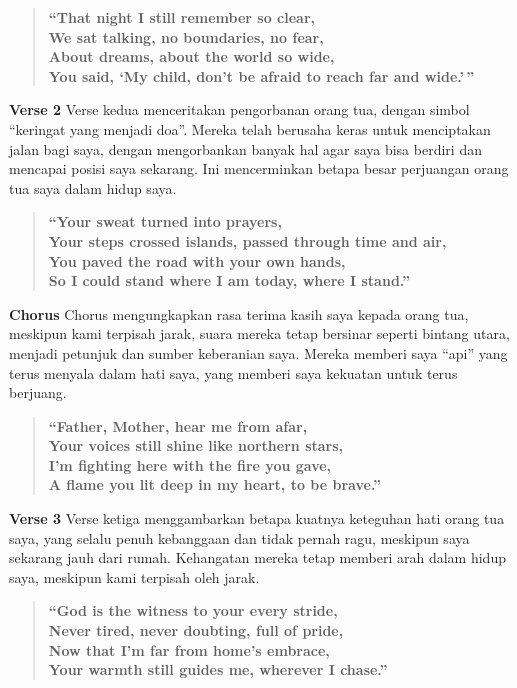 \documentclass[
  letterpaper,
  DIV=11,
  numbers=noendperiod]{scrreprt}
\begin{document}
\begin{quote}
\textbf{``That night I still remember so clear,\\
We sat talking, no boundaries, no fear,\\
About dreams, about the world so wide,\\
You said, `My child, don't be afraid to reach far and wide.'\,''}
\end{quote}

\textbf{Verse 2} Verse kedua menceritakan pengorbanan orang tua, dengan
simbol ``keringat yang menjadi doa''. Mereka telah berusaha keras untuk
menciptakan jalan bagi saya, dengan mengorbankan banyak hal agar saya
bisa berdiri dan mencapai posisi saya sekarang. Ini mencerminkan betapa
besar perjuangan orang tua saya dalam hidup saya.

\begin{quote}
\textbf{``Your sweat turned into prayers,\\
Your steps crossed islands, passed through time and air,\\
You paved the road with your own hands,\\
So I could stand where I am today, where I stand.''}
\end{quote}

\textbf{Chorus} Chorus mengungkapkan rasa terima kasih saya kepada orang
tua, meskipun kami terpisah jarak, suara mereka tetap bersinar seperti
bintang utara, menjadi petunjuk dan sumber keberanian saya. Mereka
memberi saya ``api'' yang terus menyala dalam hati saya, yang memberi
saya kekuatan untuk terus berjuang.

\begin{quote}
\textbf{``Father, Mother, hear me from afar,\\
Your voices still shine like northern stars,\\
I'm fighting here with the fire you gave,\\
A flame you lit deep in my heart, to be brave.''}
\end{quote}

\textbf{Verse 3} Verse ketiga menggambarkan betapa kuatnya keteguhan
hati orang tua saya, yang selalu penuh kebanggaan dan tidak pernah ragu,
meskipun saya sekarang jauh dari rumah. Kehangatan mereka tetap memberi
arah dalam hidup saya, meskipun kami terpisah oleh jarak.

\begin{quote}
\textbf{``God is the witness to your every stride,\\
Never tired, never doubting, full of pride,\\
Now that I'm far from home's embrace,\\
Your warmth still guides me, wherever I chase.''}
\end{quote}
\end{document}
